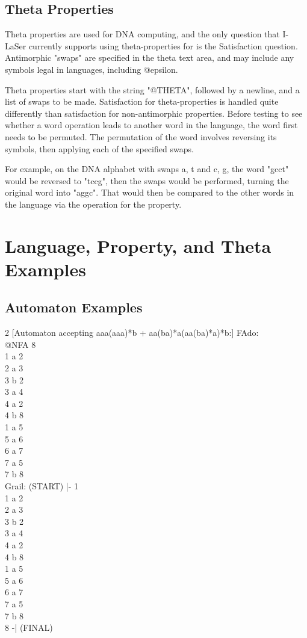 \documentclass{article}
\begin{document}
\subsection{Theta Properties}
Theta properties are used for DNA computing, and the only question that I-LaSer currently supports using theta-properties for is the Satisfaction question.
Antimorphic "swaps" are specified in the theta text area, and may include any symbols legal in languages, including @epsilon. 

Theta properties start with the string "@THETA", followed by a newline, and a list of swaps to be made. 
Satisfaction for theta-properties is handled quite differently than satisfaction for non-antimorphic properties.
Before testing to see whether a word operation leads to another word in the language, the word first needs to be permuted.
The permutation of the word involves reversing its symbols, then applying each of the specified swaps. 

For example, on the DNA alphabet with swaps {a, t} and {c, g}, the word "gcct" would be reversed to "tccg", then the swaps would be performed, turning the original word into "aggc".
That would then be compared to the other words in the language via the operation for the property.
\pagebreak
\section{Language, Property, and Theta Examples}
\subsection{Automaton Examples}
\begin{center}
\begin{multicols}{2}
[Automaton accepting aaa(aaa)*b + aa(ba)*a(aa(ba)*a)*b:]
FAdo:\\
@NFA 8\\
1 a 2\\
2 a 3\\
3 b 2\\
3 a 4\\
4 a 2\\
4 b 8\\
1 a 5\\
5 a 6\\
6 a 7\\
7 a 5\\
7 b 8\\
\columnbreak
Grail:
(START) |- 1\\1 a 2\\2 a 3\\3 b 2\\3 a 4\\4 a 2\\4 b 8\\1 a 5\\5 a 6\\6 a 7\\7 a 5\\7 b 8\\8 -| (FINAL)
\end{multicols}
\end{center}
\end{document}
